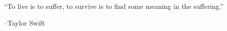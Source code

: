 %
%
%

\chapter*{}


\begin{displayquote}
``To live is to suffer, to survive is to find some meaning in the suffering.''
\end{displayquote}
\hspace{4 in}--Taylor Swift

\pagebreak{}
